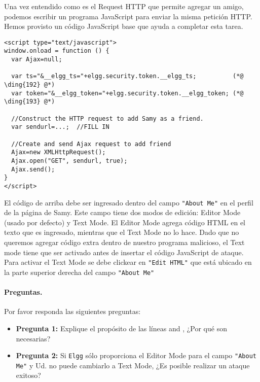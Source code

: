 Una vez entendido como es el Request HTTP que permite agregar un amigo, podemos escribir un programa JavaScript para enviar la misma petición HTTP. Hemos provisto un código JavaScript base que ayuda a completar esta tarea.
\begin{lstlisting}
<script type="text/javascript">
window.onload = function () {
  var Ajax=null;

  var ts="&__elgg_ts="+elgg.security.token.__elgg_ts;          (*@ \ding{192} @*)
  var token="&__elgg_token="+elgg.security.token.__elgg_token; (*@ \ding{193} @*)

  //Construct the HTTP request to add Samy as a friend.
  var sendurl=...;  //FILL IN

  //Create and send Ajax request to add friend
  Ajax=new XMLHttpRequest();
  Ajax.open("GET", sendurl, true);
  Ajax.send();
} 
</script>
\end{lstlisting}

El código de arriba debe ser ingresado dentro del campo \texttt{"About Me"} en el perfil de la página de Samy.
Este campo tiene dos modos de edición: Editor Mode (usado por defecto) y Text Mode.
El Editor Mode agrega código HTML en el texto que es ingresado, mientras que el Text Mode no lo hace. Dado que no queremos agregar código extra dentro de nuestro programa malicioso, el Text mode tiene que ser activado antes de insertar el código JavaScript de ataque. Para activar el Text Mode se debe clickear en \texttt{"Edit HTML"} que está ubicado en la parte superior derecha del campo \texttt{"About Me"}

\paragraph{Preguntas.} Por favor responda las siguientes preguntas:

\begin{itemize}
\item \textbf{Pregunta 1:} Explique el propósito de las líneas  and , ¿Por qué son necesarias?

\item \textbf{Pregunta 2:} Si \texttt{Elgg} sólo proporciona el Editor Mode para el campo \texttt{"About Me"} y Ud. no puede cambiarlo a Text Mode, ¿Es posible realizar un ataque exitoso? 
\end{itemize}
 



